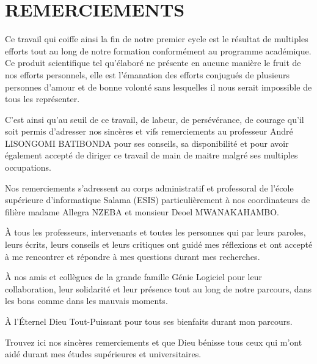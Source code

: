 \chapter*{REMERCIEMENTS}
    Ce travail qui coiffe ainsi la fin de notre premier cycle est le
    résultat de multiples efforts tout au long de notre formation conformément
    au programme académique. Ce produit scientifique tel qu’élaboré ne présente
    en aucune manière le fruit de nos efforts personnels, elle est l’émanation
    des efforts conjugués de plusieurs personnes d’amour et de bonne volonté
    sans lesquelles il nous serait impossible de tous les représenter.
    \par
    C’est ainsi qu’au seuil de ce travail, de labeur, de persévérance,
    de courage qu’il soit permis d’adresser nos sincères et vifs remerciements 
    au professeur André LISONGOMI BATIBONDA pour ses conseils, sa disponibilité et pour avoir également accepté
    de diriger ce travail de main de maitre malgré ses multiples occupations.
    \par
    Nos remerciements s’adressent au corps administratif et professoral de l’école supérieure d’informatique
    Salama (ESIS) particulièrement à nos coordinateurs de filière madame Allegra NZEBA et monsieur Deoel MWANAKAHAMBO. %
    \par
    À tous les professeurs, intervenants et toutes les
    personnes qui par leurs paroles, leurs écrits, leurs conseils et leurs critiques ont guidé mes réflexions
    et ont accepté à me rencontrer et répondre à mes questions durant mes recherches. 
    \par
    À nos amis et collègues de la grande famille Génie Logiciel
    pour leur collaboration, leur solidarité et leur présence tout au long de notre
    parcours, dans les bons comme dans les mauvais moments.
    \par
    À l’Éternel Dieu Tout-Puissant pour tous ses bienfaits durant mon parcours.
    \par
    Trouvez ici nos sincères remerciements et que Dieu bénisse tous ceux qui m’ont aidé durant mes études supérieures et
    universitaires.